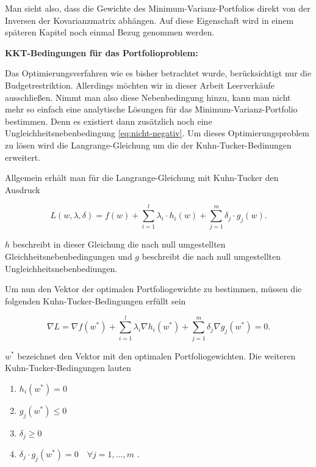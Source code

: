 \documentclass[parskip=half]{scrartcl}
\begin{document}
	Man sieht also, dass die Gewichte des Minimum-Varianz-Portfolios direkt von der Inversen der Kovarianzmatrix abhängen. Auf diese Eigenschaft wird in einem späteren Kapitel noch einmal Bezug genommen werden.
	
	\textbf{KKT-Bedingungen für das Portfolioproblem:}	
	
	Das Optimierungsverfahren wie es bisher betrachtet wurde, berücksichtigt nur die Budgetrestriktion. Allerdings möchten wir in dieser Arbeit Leerverkäufe ausschließen. Nimmt man also diese Nebenbedingung hinzu, kann man nicht mehr so einfach eine analytische Lösungen für das Minimum-Varianz-Portfolio bestimmen. Denn es existiert dann zusätzlich noch eine Ungleichheitsnebenbedingung \eqref{eq:nicht-negativ}. Um dieses Optimierungsproblem zu lösen wird die Langrange-Gleichung um die der Kuhn-Tucker-Bedinungen erweitert.
	
	Allgemein erhält man für die Langrange-Gleichung mit Kuhn-Tucker den Ausdruck \parencite[260]{Nickel}
	
	\begin{equation}
		L(w, \lambda, \delta) = f(w) + \sum_{i=1}^{l} \lambda_i \cdot h_i(w) + \sum_{j=1}^{m} \delta_j \cdot g_j(w) . \label{eq:langrange_kkt}
	\end{equation}
	
	$h$ beschreibt in dieser Gleichung die nach null umgestellten Gleichheitsnebenbedingungen und $g$ beschreibt die nach null umgestellten Ungleichheitsnebenbediungen.
	
	
	Um nun den Vektor der optimalen Portfoliogewichte zu bestimmen, müssen die folgenden Kuhn-Tucker-Bedingungen erfüllt sein \parencite[260]{Nickel}
	
	\begin{equation}
		\nabla L = \nabla f(w^*) + \sum_{i=1}^{l} \lambda_i \nabla h_i(w^*) + \sum_{j=1}^{m} \delta_j \nabla g_j (w^*) = 0 .
	\end{equation}
	
	$w^*$ bezeichnet den Vektor mit den optimalen Portfoliogewichten. Die weiteren Kuhn-Tucker-Bedingungen lauten
	
	\begin{enumerate}
		\item $h_i(w^*) = 0$
		\item $g_j(w^*) \leq 0$
		\item $\delta_j \geq 0$
		\item $\delta_j \cdot g_j(w^*) = 0 \quad \forall j=1, ..., m$ .
	\end{enumerate}
	
\end{document}
